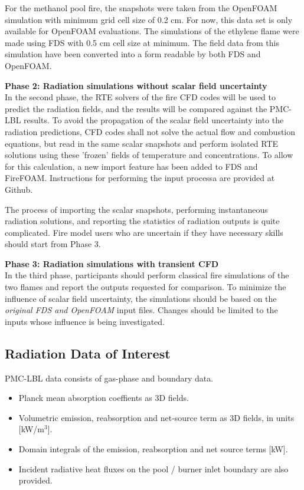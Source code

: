 \documentclass[12pt]{article}
\begin{document}
For the methanol pool fire, the snapshots were taken from the OpenFOAM simulation with minimum grid cell size of 0.2 cm. For now, this data set is only available for OpenFOAM evaluations. The simulations of the ethylene flame were made using FDS with 0.5 cm cell size at minimum. The field data from this simulation have been converted into a form readable by both FDS and OpenFOAM.

\noindent \textbf{Phase 2: Radiation simulations without scalar field uncertainty}\\
In the second phase, the RTE solvers of the fire CFD codes will be used to predict the radiation fields, and the results will be compared against the PMC-LBL results. To avoid the propagation of the scalar field uncertainty into the radiation predictions, CFD codes shall not solve the actual flow and combustion equations, but read in the same scalar snapshots and perform isolated RTE solutions using these 'frozen' fields of temperature and concentrations. To allow for this calculation, a new import feature has been added to FDS and FireFOAM. Instructions for performing the input processa are provided at Github. 

The process of importing the scalar snapshots, performing instantaneous radiation solutions, and reporting the statistics of radiation outputs is quite complicated. Fire model users who are uncertain if they have necessary skills should start from Phase 3.

\noindent \textbf{Phase 3: Radiation simulations with transient CFD}\\
In the third phase, participants should perform classical fire simulations of the two flames and report the outputs requested for comparison. To minimize the influence of scalar field uncertainty, the simulations should be based on the \textit{original FDS and OpenFOAM} input files. Changes should be limited to the inputs whose influence is being investigated.

\subsection{Radiation Data of Interest}

PMC-LBL data consists of gas-phase and boundary data. 
\begin{itemize}[noitemsep]
    \item Planck mean absorption coeffients as 3D fields.
    \item Volumetric emission, reabsorption and net-source term as 3D fields, in units [kW/m$^3$]. \item Domain integrals of the emission, reabsorption and net source terms [kW].
    \item Incident radiative heat fluxes on the pool / burner inlet boundary are also provided.
\end{itemize}
\end{document}
